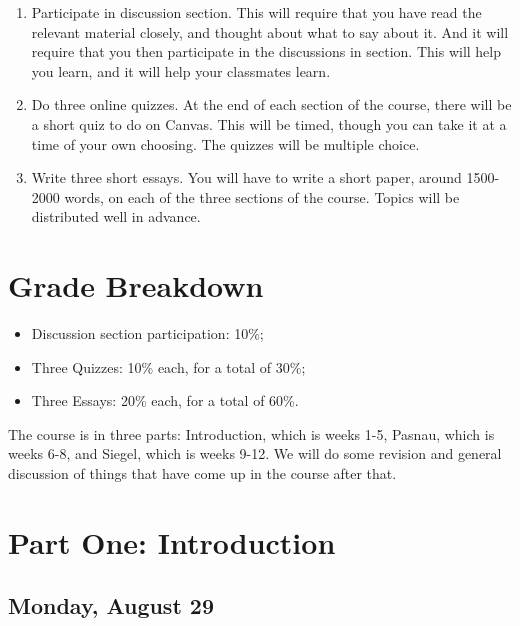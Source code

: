 \documentclass[
]{article}
\providecommand{\tightlist}{%
  \setlength{\itemsep}{0pt}\setlength{\parskip}{0pt}}\usepackage{longtable,booktabs,array}
\begin{document}
\begin{enumerate}
\def\labelenumi{\arabic{enumi}.}
\item
  Participate in discussion section. This will require that you have
  read the relevant material closely, and thought about what to say
  about it. And it will require that you then participate in the
  discussions in section. This will help you learn, and it will help
  your classmates learn.
\item
  Do three online quizzes. At the end of each section of the course,
  there will be a short quiz to do on Canvas. This will be timed, though
  you can take it at a time of your own choosing. The quizzes will be
  multiple choice.
\item
  Write three short essays. You will have to write a short paper, around
  1500-2000 words, on each of the three sections of the course. Topics
  will be distributed well in advance.
\end{enumerate}

\hypertarget{grade-breakdown}{%
\section{Grade Breakdown}\label{grade-breakdown}}

\begin{itemize}
\tightlist
\item
  Discussion section participation: 10\%;
\item
  Three Quizzes: 10\% each, for a total of 30\%;
\item
  Three Essays: 20\% each, for a total of 60\%.
\end{itemize}

\newpage

The course is in three parts: Introduction, which is weeks 1-5, Pasnau,
which is weeks 6-8, and Siegel, which is weeks 9-12. We will do some
revision and general discussion of things that have come up in the
course after that.

\hypertarget{part-one-introduction}{%
\section{Part One: Introduction}\label{part-one-introduction}}

\hypertarget{monday-august-29}{%
\subsection{Monday, August 29}\label{monday-august-29}}
\end{document}
